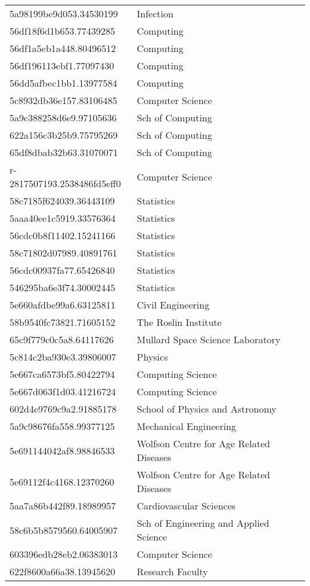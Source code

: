 \begin{tabular}{ll}
5a98199be9d053.34530199 & Infection \\
56df18f6d1b653.77439285 & Computing \\
56df1a5eb1a448.80496512 & Computing \\
56df196113ebf1.77097430 & Computing \\
56dd5afbec1bb1.13977584 & Computing \\
5c8932db36e157.83106485 & Computer Science \\
5a9c388258d6e9.97105636 & Sch of Computing \\
622a156c3b25b9.75795269 & Sch of Computing \\
65df8dbab32b63.31070071 & Sch of Computing \\
r-2817507193.2538486fd5eff0 & Computer Science \\
58c7185f624039.36443109 & Statistics \\
5aaa40ee1c5919.33576364 & Statistics \\
56cdc0b8f11402.15241166 & Statistics \\
58c71802d07989.40891761 & Statistics \\
56cdc00937fa77.65426840 & Statistics \\
546295ba6e3f74.30002445 & Statistics \\
5e660afdbe99a6.63125811 & Civil Engineering \\
58b9540fc73821.71605152 & The Roslin Institute \\
65c9f779c0c5a8.64117626 & Mullard Space Science Laboratory \\
5c814c2ba930e3.39806007 & Physics \\
5e667ca6573bf5.80422794 & Computing Science \\
5e667d063f1d03.41216724 & Computing Science \\
602d4e9769c9a2.91885178 & School of Physics and Astronomy \\
5a9c98676fa558.99377125 & Mechanical Engineering \\
5e691144042af8.98846533 & Wolfson Centre for Age Related Diseases \\
5e69112f4c4168.12370260 & Wolfson Centre for Age Related Diseases \\
5aa7a86b442f89.18989957 & Cardiovascular Sciences \\
58c6b5b8579560.64005907 & Sch of Engineering and Applied Science \\
603396edb28eb2.06383013 & Computer Science \\
622f8600a66a38.13945620 & Research Faculty \\

\end{tabular}
